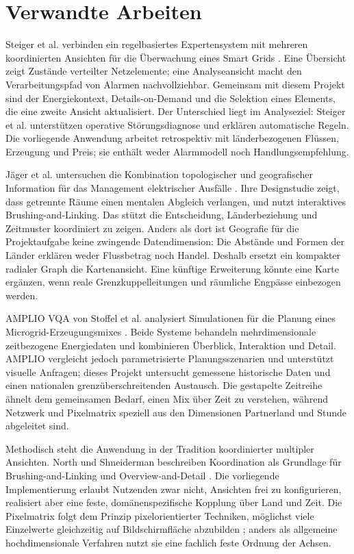 \section{Verwandte Arbeiten}
\label{sec:related}

Steiger et al. verbinden ein regelbasiertes Expertensystem mit mehreren
koordinierten Ansichten für die Überwachung eines Smart Grids
\cite{steiger2013smartgrid}. Eine Übersicht zeigt Zustände verteilter
Netzelemente; eine Analyseansicht macht den Verarbeitungspfad von Alarmen
nachvollziehbar. Gemeinsam mit diesem Projekt sind der Energiekontext,
Details-on-Demand und die Selektion eines Elements, die eine zweite Ansicht
aktualisiert. Der Unterschied liegt im Analyseziel: Steiger et al. unterstützen
operative Störungsdiagnose und erklären automatische Regeln. Die vorliegende
Anwendung arbeitet retrospektiv mit länderbezogenen Flüssen, Erzeugung und
Preis; sie enthält weder Alarmmodell noch Handlungsempfehlung.

Jäger et al. untersuchen die Kombination topologischer und geografischer
Information für das Management elektrischer Ausfälle
\cite{jaeger2016outage}. Ihre Designstudie zeigt, dass getrennte Räume einen
mentalen Abgleich verlangen, und nutzt interaktives Brushing-and-Linking. Das
stützt die Entscheidung, Länderbeziehung und Zeitmuster koordiniert zu zeigen.
Anders als dort ist Geografie für die Projektaufgabe keine zwingende
Datendimension: Die Abstände und Formen der Länder erklären weder Flussbetrag
noch Handel. Deshalb ersetzt ein kompakter radialer Graph die Kartenansicht.
Eine künftige Erweiterung könnte eine Karte ergänzen, wenn reale
Grenzkuppelleitungen und räumliche Engpässe einbezogen werden.

AMPLIO VQA von Stoffel et al. analysiert Simulationen für die Planung eines
Microgrid-Erzeugungsmixes \cite{stoffel2012amplio}. Beide Systeme behandeln
mehrdimensionale zeitbezogene Energiedaten und kombinieren Überblick,
Interaktion und Detail. AMPLIO vergleicht jedoch parametrisierte
Planungsszenarien und unterstützt visuelle Anfragen; dieses Projekt untersucht
gemessene historische Daten und einen nationalen grenzüberschreitenden
Austausch. Die gestapelte Zeitreihe ähnelt dem gemeinsamen Bedarf, einen Mix
über Zeit zu verstehen, während Netzwerk und Pixelmatrix speziell aus den
Dimensionen Partnerland und Stunde abgeleitet sind.

Methodisch steht die Anwendung in der Tradition koordinierter multipler
Ansichten. North und Shneiderman beschreiben Koordination als Grundlage für
Brushing-and-Linking und Overview-and-Detail \cite{north2000snap}. Die
vorliegende Implementierung erlaubt Nutzenden zwar nicht, Ansichten frei zu
konfigurieren, realisiert aber eine feste, domänenspezifische Kopplung über
Land und Zeit. Die Pixelmatrix folgt dem Prinzip pixelorientierter Techniken,
möglichst viele Einzelwerte gleichzeitig auf Bildschirmfläche abzubilden
\cite{keim2000pixel}; anders als allgemeine hochdimensionale Verfahren nutzt
sie eine fachlich feste Ordnung der Achsen.

